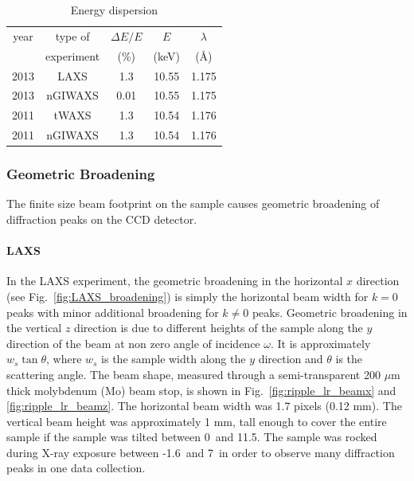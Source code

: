 \begin{table}[htbp]
  \centering
  \begin{tabular}{ccccc}
    \hline
    year & type of & $\Delta E/E$ & $E$ & $\lambda$ \\
     & experiment & (\%) & (keV) & (\AA) \\
    \hline
    2013 & LAXS & 1.3 & 10.55 & 1.175 \\
    2013 & nGIWAXS & 0.01 & 10.55 & 1.175 \\
    2011 & tWAXS & 1.3 & 10.54 & 1.176 \\
    2011 & nGIWAXS & 1.3 & 10.54 & 1.176 \\
    \hline
  \end{tabular}
  \caption[Energy dispersion]
  {Energy dispersion}
  \label{tab:energy_dispersion}
\end{table}

\subsubsection{Geometric Broadening}\label{sec:geometric_broadening}
The finite size beam footprint on the sample causes
geometric broadening of diffraction peaks on the CCD detector.

\paragraph{LAXS}
In the LAXS experiment, 
the geometric broadening in the horizontal $x$ direction 
(see Fig.~\ref{fig:LAXS_broadening}) is simply the 
horizontal beam width for $k=0$ peaks with minor additional broadening
for $k\neq 0$ peaks. Geometric broadening in the vertical $z$ direction
is due to different heights of the sample along the $y$ direction of the beam 
at non zero angle of incidence $\omega$. It is 
approximately
$w_s\tan\theta$, where $w_s$ is the sample width along the $y$
direction and $\theta$ is the scattering angle.
The beam shape, measured through a semi-transparent 200 $\mu$m thick
molybdenum (Mo) beam stop, is shown in Fig.~\ref{fig:ripple_lr_beamx}
and \ref{fig:ripple_lr_beamz}.
The horizontal beam width was 1.7 pixels (0.12 mm). The vertical beam
height was approximately 1 mm, tall enough to cover the entire sample
if the sample was tilted between 0\textdegree\ and 11.5\textdegree. 
The sample was rocked
during X-ray exposure between -1.6\textdegree\ and 7\textdegree\ 
in order to observe many diffraction peaks in one data collection.

